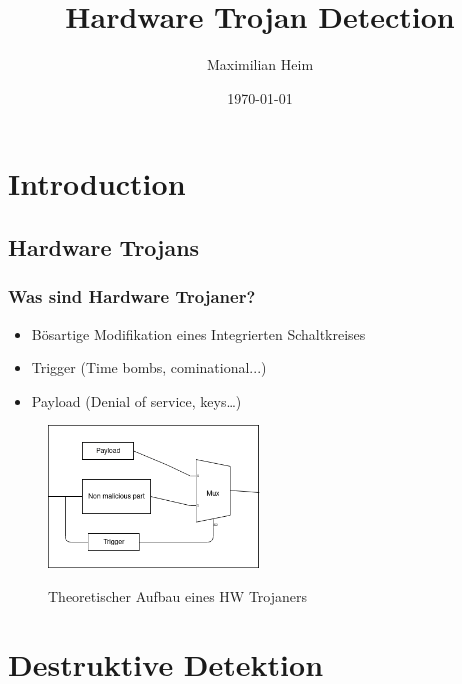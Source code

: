 \documentclass[11pt]{beamer}
\author{Maximilian Heim}
\title{Hardware Trojan Detection}
\institute{University Albstadt-Sigmaringen}
\date{\today}
\begin{document}
\begin{frame}
\titlepage
\end{frame}

\begin{frame}
\tableofcontents
\end{frame}

\section{Introduction}
\subsection{Hardware Trojans}
\begin{frame}
    \frametitle{Was sind Hardware Trojaner?}
    \begin{itemize}
    \item Bösartige Modifikation eines Integrierten Schaltkreises
    \item Trigger (Time bombs, cominational...)
    \item Payload (Denial of service, keys\ldots)
    \end{itemize}
    \begin{figure}
        \caption{Theoretischer Aufbau eines HW Trojaners}
        \includegraphics[width=0.5\textwidth]{triggerpayload.png}
        \label{trpl}
    \end{figure}
\end{frame}

\section{Destruktive Detektion}
\end{document}
